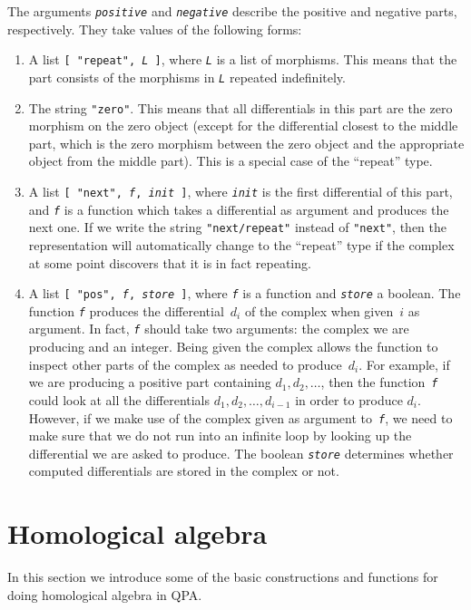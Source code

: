 \documentclass{amsart}
\theoremstyle{definition}
\newcommand{\code}[1]{\texttt{#1}}
\newcommand{\Arg}[1]{\texttt{\textit{#1}}}
\theoremstyle{theoretic}
\begin{document}
The arguments \Arg{positive} and \Arg{negative} describe the positive
and negative parts, respectively.  They take values of the following
forms:
\begin{enumerate}
\item A list \code{[ "repeat", \Arg{L} ]}, where \Arg{L} is a list of
morphisms.  This means that the part consists of the morphisms in
\Arg{L} repeated indefinitely.
\item The string \code{"zero"}.  This means that all differentials in
this part are the zero morphism on the zero object (except for the
differential closest to the middle part, which is the zero morphism
between the zero object and the appropriate object from the middle
part).  This is a special case of the ``repeat'' type.
\item A list \code{[ "next", \Arg{f}, \Arg{init} ]}, where \Arg{init}
is the first differential of this part, and \Arg{f} is a function
which takes a differential as argument and produces the next one.  If
we write the string \code{"next/repeat"} instead of \code{"next"},
then the representation will automatically change to the ``repeat''
type if the complex at some point discovers that it is in fact
repeating.
\item A list \code{[ "pos", \Arg{f}, \Arg{store} ]}, where \Arg{f} is
a function and \Arg{store} a boolean.  The function \Arg{f} produces
the differential~$d_i$ of the complex when given~$i$ as argument.  In
fact, \Arg{f} should take two arguments: the complex we are producing
and an integer.  Being given the complex allows the function to
inspect other parts of the complex as needed to produce~$d_i$.  For
example, if we are producing a positive part containing $d_1, d_2,
\ldots$, then the function~\Arg{f} could look at all the differentials
$d_1, d_2, \ldots, d_{i-1}$ in order to produce $d_i$.  However, if we
make use of the complex given as argument to~\Arg{f}, we need to make
sure that we do not run into an infinite loop by looking up the
differential we are asked to produce.  The boolean \Arg{store}
determines whether computed differentials are stored in the complex or
not.
\end{enumerate}


\section{Homological algebra}
In this section we introduce some of the basic constructions and
functions for doing homological algebra in QPA.  
\end{document}
